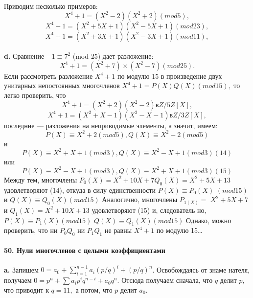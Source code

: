 \pagebreak
\noindent Приводим несколько примеров:
$$X^{4} + 1 = (X^{2} - 2 )(X^{2} + 2) (mod 5),$$
$$X^{4} + 1 = (X^{2} + 5X + 1 )(X^{2} - 5X + 1) (mod 23),$$
$$X^{4} + 1 = (X^{2} + 3X + 1 )(X^{2} - 3X + 1) (mod 11),$$
\\
\hspace*{15pt}\textbf{d.} Сравнение $-1 \equiv 7^{2}$ (mod 25) дает разложение:
$$X^{4} + 1 = (X^{2} +7) \times (X^{2} - 7) (mod 25).$$
Если рассмотреть разложение $X^{4} + 1$ по модулю 15 в произведение двух\linebreak
унитарных непостоянных многочленов $X^{4} + 1 = P(X)Q(X) (mod 15),$\linebreak
то легко проверить, что
$$X^{4} + 1 = (X^{2} + 2 )(X^{2} - 2) в Z/5Z[X],$$
$$X^{4} + 1 = (X^{2} + X - 1 )(X^{2} - X - 1) в Z/3Z[X],$$
последние --- разложения на неприводимые элементы, а значит, имеем: 
$$P(X) \equiv X^{2} + 2 (mod 5), Q(X) \equiv X^{2} - 2 (mod 5)$$
и
$$P(X) \equiv X^{2} + X + 1 (mod 3), Q(X) \equiv X^{2} - X + 1 (mod 3)   (14)$$
или
$$P(X) \equiv X^{2} - X + 1 (mod 3), Q(X) \equiv X^{2} + X + 1 (mod 3)   (15)$$
Между тем, многочлены $P_{0}(X) = X^{2} + 10X + 7   Q_{0}(X) = X^{2} + 5X + 13$\linebreak
удовлетворяют (14), откуда в силу единственности $P(X) \equiv P_{0}(X)$\linebreak
$(mod 15)$ и $Q(X) \equiv Q_0(X) (mod 15)$ Аналогично, многочлены $P_{1(X)} =$\linebreak
$X^{2} + 5X + 7$ и $Q_{1}(X) = X^{2} + 10X + 13$ удовлетворяют (15) и, следователь­\linebreak
но,$P(X) \equiv P_{1}(X) (mod 15)$ $Q(X) \equiv Q_{1}(X) (mod 15)$ Однако, можно\linebreak
проверить, что ни $P_0Q_0$ ни $P_1Q_1$  не равны $X^{4} + 1$ по модулю 15\ldots\\
\\
\noindent\textbf{50. Нули многочленов с целыми коэффициентами}\\
\\
\hspace*{15pt}\textbf{a.}  Запишем $0 = a_0+\sum^{n-1}_{i=1}a_{i}(p/q)^{i} + (p/q)^{n}$. Освобождаясь от знаме­
нателя, получаем $0 = p^{n}+\sum a_{i}p^{i}q^{n-i}+a_{0}q^{n}.$ Отсюда получаем сначала, 
что $q$ делит $p$, что приводит к $q = 11,$ а потом, что $p$ делит $a_0$.
